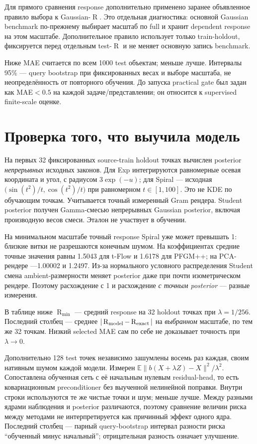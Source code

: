 \documentclass[10pt,a4paper]{article}
\newcommand{\R}{\operatorname{R}}
\begin{document}
Для прямого сравнения response дополнительно применено заранее объявленное
правило выбора к Gaussian-$\R$. Это отдельная диагностика: основной Gaussian
benchmark по-прежнему выбирает масштаб по full и хранит dependent response
на этом масштабе. Дополнительное правило использует только train-holdout,
фиксируется перед отдельным test-$\R$ и не меняет основную запись benchmark.

Ниже MAE считается по всем 1000 test объектам; меньше лучше. Интервалы 95\% ---
query bootstrap при фиксированных весах и выборе масштаба, не неопределённость
от повторного обучения. До запуска practical gate был задан как MAE$<0.5$
на каждой задаче/представлении; он относится к supervised finite-scale оценке.




\section*{Проверка того, что выучила модель}
На первых 32 фиксированных source-train holdout точках вычислен posterior
\emph{непрерывных} исходных законов. Для Exp интегрируются равномерные осевая
координата и угол, с радиусом $3\exp(-u)$; для Spiral --- исходная
$\big(\sin(t^2)/t,\cos(t^2)/t\big)$ при равномерном $t\in[1,100]$.
Это не KDE по обучающим точкам. Учитывается точный измеренный Gram рендера.
Student posterior получен Gamma-смесью непрерывных Gaussian posterior,
включая производную весов смеси. Эталон не участвует в обучении.

На минимальном масштабе точный response Spiral уже может превышать 1: близкие
витки не разрешаются конечным шумом. На коэффициентах средние точные значения
равны 1.5043 для t-Flow и 1.6178 для PFGM++; на PCA-рендере ---1.00002 и 1.2497.
Из-за нормального условного распределения Student смена ambient-размерности
меняет posterior даже при почти изометрическом рендере. Поэтому расхождение
с 1 и расхождение \emph{с точным posterior} --- разные измерения.

В таблице ниже $\R_{\min}$ --- средний response на 32 holdout точках при
$\lambda=1/256$. Последний столбец --- среднее $|\R_{\rm model}-\R_{\rm exact}|$
на \emph{выбранном} масштабе, по тем же 32 точкам. Низкий selected MAE сам по себе
не доказывает точность при $\lambda\to0$.


Дополнительно 128 test точек независимо зашумлены восемь раз каждая, своим
нативным шумом каждой модели. Измерен $\mathbb{E}\|b(X+\lambda Z)-X\|^2/\lambda^2$.
Сопоставлена обученная сеть с её начальным нулевым residual-head, то есть
ковариационным preconditioner без выученной нелинейной поправки. Внутри строки
используются те же чистые точки и шум; меньше лучше. Между разными ядрами
наблюдения и posterior различаются, поэтому сравнение величин риска между
методами не интерпретируется как причинный эффект одного ядра.
Последний столбец --- парный query-bootstrap интервал разности риска
``обученный минус начальный''; отрицательная разность означает улучшение.

\end{document}
